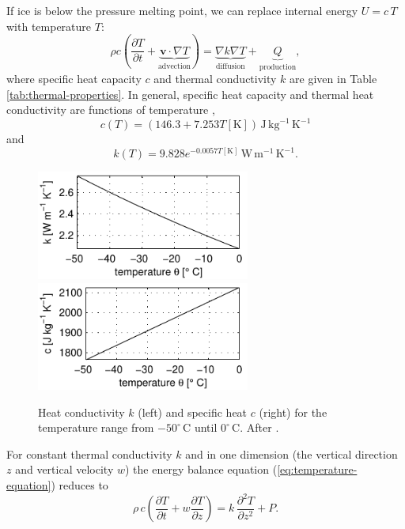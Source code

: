 \documentclass[parskip=half]{scrartcl}
\newcommand{\cels}[1]{\ensuremath{#1^{\circ}\,\mathrm{C}}}
\newcommand{\bv}{\mathbf{v}}
\newcommand{\ddz}[1]{\ensuremath{\frac{\partial #1}{\partial z}}}
\newcommand{\ddt}[1]{\ensuremath{\frac{\partial #1}{\partial t}}}
\newcommand{\grad}{\nabla}
\begin{document}
If ice is below the pressure melting point, we can replace internal
energy $U=c\,T$ with temperature $T$:
\begin{equation}
  \label{eq:temperature-equation} \rho c\left(\ddt{T} + \underbrace{\bv
\cdot \grad T}_{\textrm{advection}}\right) = \underbrace{\nabla
k\nabla T}_{\textrm{diffusion}} +
\underbrace{Q}_{\textrm{production}},
\end{equation} where specific heat capacity $c$ and thermal
conductivity $k$ are given in Table \ref{tab:thermal-properties}. In
general, specific heat capacity and thermal heat conductivity are
functions of temperature \citep[e.g.][]{Ritz1987},
\begin{equation}
  \label{eq:specific-heat} c(T) = (146.3 + 7.253 T
[\text{K}])\,\text{J}\,\text{kg}^{-1}\,\text{K}^{-1}
\end{equation} and
\begin{equation}
  \label{eq:heat-conductivity} k(T) = 9.828 e^{-0.0057 T
[\text{K}]}\,\text{W}\,\text{m}^{-1}\,\text{K}^{-1}.
\end{equation}

\begin{figure} \centering
   \includegraphics[width=7cm]{figures/k} \hfill
   \includegraphics[width=7cm]{figures/c}
   \caption{Heat conductivity $k$ (left) and specific heat $c$ (right)
for the temperature range from \cels{-50} until \cels{0}. After
\cite{Ritz1987}.}
\end{figure}
%
For constant thermal conductivity $k$ and in one dimension (the
vertical direction $z$ and vertical velocity $w$) the energy balance
equation (\ref{eq:temperature-equation}) reduces to
%
\begin{equation}
 \label{eq:heat-diffusion-advection-1d} \rho\, c \left(\ddt{T} + w
\ddz{T}\right) = k\, \frac{\partial^2T}{\partial z^2} + P.
\end{equation}
\end{document}
